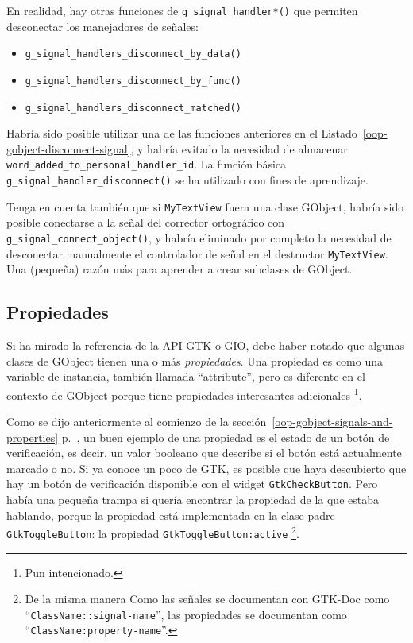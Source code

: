 \vspace{0.7cm}


En realidad, hay otras funciones de \lstinline{g_signal_handler*()} que permiten desconectar los manejadores de señales:
\begin{itemize}
  \item \lstinline{g_signal_handlers_disconnect_by_data()}
  \item \lstinline{g_signal_handlers_disconnect_by_func()}
  \item \lstinline{g_signal_handlers_disconnect_matched()}
\end{itemize}

Habría sido posible utilizar una de las funciones anteriores en el Listado~\ref{oop-gobject-disconnect-signal}, y habría evitado la necesidad de almacenar \lstinline{word_added_to_personal_handler_id}. La función básica \lstinline{g_signal_handler_disconnect()} se ha utilizado con fines de aprendizaje.

Tenga en cuenta también que si \lstinline{MyTextView} fuera una clase GObject, habría sido posible conectarse a la señal del corrector ortográfico con \lstinline{g_signal_connect_object()}, y habría eliminado por completo la necesidad de desconectar manualmente el controlador de señal en el destructor \lstinline{MyTextView}. Una (pequeña) razón más para aprender a crear subclases de GObject.

\subsection{Propiedades}

Si ha mirado la referencia de la API GTK o GIO, debe haber notado que algunas clases de GObject tienen una o más \emph{propiedades}. Una propiedad es como una variable de instancia, también llamada ``attribute'', pero es diferente en el contexto de GObject porque tiene propiedades interesantes adicionales \footnote{Pun intencionado.}.

Como se dijo anteriormente al comienzo de la sección~\ref{oop-gobject-signals-and-properties} p.~\pageref{oop-gobject-signals-and-properties}, un buen ejemplo de una propiedad es el estado de un botón de verificación, es decir, un valor booleano que describe si el botón está actualmente marcado o no. Si ya conoce un poco de GTK, es posible que haya descubierto que hay un botón de verificación disponible con el widget \lstinline{GtkCheckButton}. Pero había una pequeña trampa si quería encontrar la propiedad de la que estaba hablando, porque la propiedad está implementada en la clase padre \lstinline{GtkToggleButton}: la propiedad \lstinline{GtkToggleButton:active} \footnote{De la misma manera Como las señales se documentan con GTK-Doc como ``\lstinline{ClassName::signal-name}'', las propiedades se documentan como ``\lstinline{ClassName:property-name}''.}.

